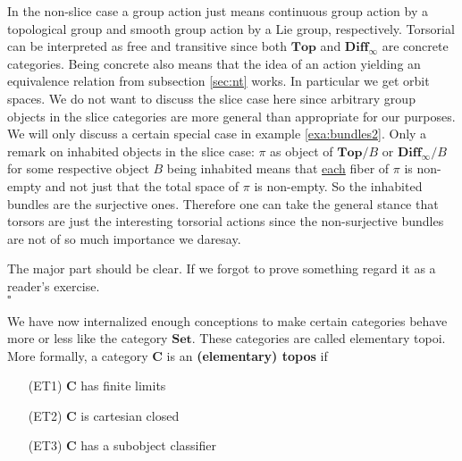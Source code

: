 \begin{exa}
\begin{enumerate}
In the non-slice case a group action just means continuous group action by a topological group and smooth group action by a Lie group, respectively. Torsorial can be interpreted as free and transitive since both $\mathbf{Top}$ and $\mathbf{Diff}_{\infty}$ are concrete categories. Being concrete also means that the idea of an action yielding an equivalence relation from subsection \ref{sec:nt} works. In particular we get orbit spaces. We do not want to discuss the slice case here since arbitrary group objects in the slice categories are more general than appropriate for our purposes. We will only discuss a certain special case in example \ref{exa:bundles2}. Only a remark on inhabited objects in the slice case: $\pi$ as object of $\mathbf{Top} \slash B$ or $\mathbf{Diff}_{\infty} \slash B$ for some respective object $B$ being inhabited means that \underline{each} fiber of $\pi$ is non-empty and not just that the total space of $\pi$ is non-empty. So the inhabited bundles are the surjective ones. Therefore one can take the general stance that torsors are just the interesting torsorial actions since the non-surjective bundles are not of so much importance we daresay.
\end{enumerate}
\end{exa}
\begin{prf}
The major part should be clear. If we forgot to prove something regard it as a reader's exercise.
\\
\phantom{proven}
\hfill
$\square$
\end{prf}
We have now internalized enough conceptions to make certain categories behave more or less like the category $\mathbf{Set}$. These categories are called elementary topoi. More formally, a category $\mathbf{C}$ is an \textbf{(elementary) topos} if
\begin{enumerate}
\item[(ET1)]
$\mathbf{C}$ has finite limits
\item[(ET2)]
$\mathbf{C}$ is cartesian closed
\item[(ET3)]
$\mathbf{C}$ has a subobject classifier
\end{enumerate}

